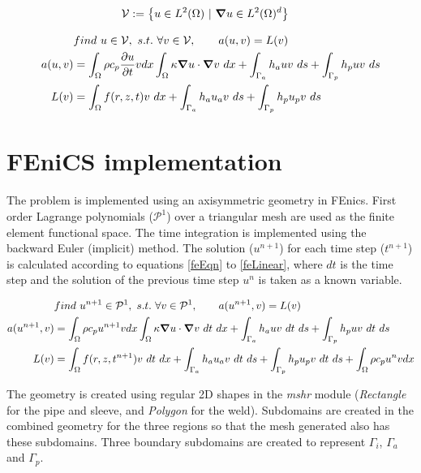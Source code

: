 \documentclass{article}
\begin{document}
\begin{align}
\mathcal{V} &:= \qty{u \in L^2(\Omega) ~|~ \grad u \in L^{2}(\Omega)^d}\label{vSpaces} 
\end{align} 
 
\begin{align}
&find ~u \in \mathcal{V},~s.t.~ \forall v \in \mathcal{V}, \qquad  a(u,v) = L(v) \label{weakEqn} \\
a(u,v) &= \int_\Omega \rho c_p \pdv{u}{t} v dx \int_\Omega\kappa\grad u \cdot \grad v ~dx  + \int_{\Gamma_a} h_a u v ~ds + \int_{\Gamma_p} h_p u v ~ds \label{bilinear} \\
L(v) &= \int_\Omega f(r,z,t) v ~dx + \int_{\Gamma_a} h_a u_a v ~ds + \int_{\Gamma_p} h_p u_p v ~ds \label{linear}
\end{align}

\section{FEniCS implementation}
The problem is implemented using an axisymmetric geometry in FEnics. First order Lagrange polynomials ($\mathcal{P}^1$) over a triangular mesh are used as the finite element functional space. The time integration is implemented using the backward Euler (implicit) method. The solution ($u^{n+1}$) for each time step ($t^{n+1}$) is calculated according to equations \ref{feEqn} to \ref{feLinear}, where $dt$ is the time step and the solution of the previous time step $u^n$ is taken as a known variable. 

\begin{align}
&find ~u^{n+1} \in \mathcal{P}^1,~s.t.~ \forall v \in \mathcal{P}^1, \qquad  a(u^{n+1},v) = L(v) \label{feEqn} \\
a(u^{n+1},v) &= \int_\Omega \rho c_p u^{n+1} v dx \int_\Omega \kappa \grad u \cdot \grad v ~dt ~dx  + \int_{\Gamma_a} h_a u v ~dt ~ds + \int_{\Gamma_p} h_p u v ~dt ~ds \label{feBilinear} \\
L(v) &= \int_\Omega f(r,z,t^{n+1})  v ~dt ~dx + \int_{\Gamma_a} h_a u_a v ~dt ~ds + \int_{\Gamma_p} h_p u_p v ~dt ~ds + \int_\Omega \rho c_p u^{n} v dx \label{feLinear}
\end{align}

The geometry is created using regular 2D shapes in the \textit{mshr} module (\textit{Rectangle} for the pipe and sleeve,  and \textit{Polygon} for the weld). Subdomains are created in the combined geometry for the three regions so that the mesh generated also has these subdomains. Three boundary subdomains are created to represent $\Gamma_i$, $\Gamma_a$ and $\Gamma_p$. 
\end{document}
